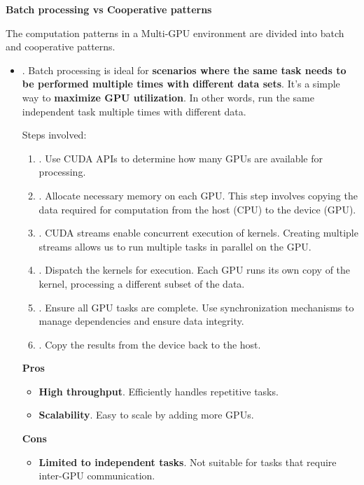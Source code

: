 \begin{flushleft}
  \textcolor{Green3}{ \textbf{Batch processing vs Cooperative patterns}}
\end{flushleft}
The computation patterns in a Multi-GPU environment are divided into batch and cooperative patterns.
\begin{itemize}
  \item {}. Batch processing is ideal for \textbf{scenarios where the same task needs to be performed multiple times with different data sets}. It's a simple way to \textbf{maximize GPU utilization}. In other words, run the same independent task multiple times with different data.

  Steps involved:
  \begin{enumerate}
    \item {}. Use CUDA APIs to determine how many GPUs are available for processing.
    \item {}. Allocate necessary memory on each GPU. This step involves copying the data required for computation from the host (CPU) to the device (GPU).
    \item {}. CUDA streams enable concurrent execution of kernels. Creating multiple streams allows us to run multiple tasks in parallel on the GPU.
    \item {}. Dispatch the kernels for execution. Each GPU runs its own copy of the kernel, processing a different subset of the data.
    \item {}. Ensure all GPU tasks are complete. Use synchronization mechanisms to manage dependencies and ensure data integrity.
    \item {}. Copy the results from the device back to the host.
  \end{enumerate}

  \begin{flushleft}
    \textcolor{Green3}{ \textbf{Pros}}
  \end{flushleft}
  \begin{itemize}[label=\textcolor{Green3}{}]
    \item \textcolor{Green3}{\textbf{High throughput}}. Efficiently handles repetitive tasks.
    \item \textcolor{Green3}{\textbf{Scalability}}. Easy to scale by adding more GPUs.
  \end{itemize}
  \begin{flushleft}
    \textcolor{Red2}{ \textbf{Cons}}
  \end{flushleft}
  \begin{itemize}[label=\textcolor{Red2}{}]
    \item \textcolor{Red2}{\textbf{Limited to independent tasks}}. Not suitable for tasks that require inter-GPU communication.
  \end{itemize}



\end{itemize}
